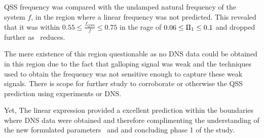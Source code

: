 QSS frequency was compared with the undamped natural frequency of the system $f$, in the region where a linear frequency was not predicted. This revealed that it was within $0.55\leq\frac{f_{QSS}}{f}\leq0.75$ in the rage of $0.06\leq\Pi_1\leq0.1$ and dropped further as \massstiff\ reduces.  

The mere existence of this region questionable as no DNS data could be obtained in this region due to the fact that galloping signal was weak and the techniques used to obtain the  frequency was not sensitive enough to capture these weak signals. There is scope for further study to corroborate or otherwise the QSS prediction using experiments or DNS. 

Yet, The linear expression provided a excellent prediction within the boundaries where DNS data were obtained and therefore complimenting the understanding of the new formulated parameters \massstiff\ and \massdamp and concluding phase 1 of the study.

   



